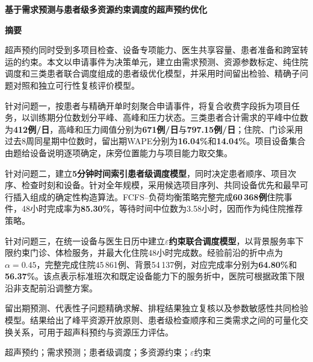 \documentclass[UTF8,a4paper,zihao=-4,fontset=windows]{ctexart}
\renewcommand{\thesubsection}{\arabic{section}.\arabic{subsection}}
\begin{document}
\songti{}\color{black}
\begin{center}
 \vspace*{0.10cm}
 {\heiti{}\bfseries 基于需求预测与患者级多资源约束调度的超声预约优化}\par
 \vspace{14pt}
 {\heiti{}\bfseries 摘\quad 要}
\end{center}

超声预约同时受到多项目检查、设备专项能力、医生共享容量、患者准备和跨室转运的约束。本文以申请事件为决策单元，建立由需求预测、资源参数标定、纯住院调度和三类患者联合调度组成的患者级优化模型，并采用时间留出检验、精确子问题对照和独立可行性复核评价模型。

针对问题一，按患者与精确开单时刻聚合申请事件，将复合收费字段拆为项目任务，以训练期分位数划分平峰、高峰和压力状态。三类患者合计需求的平峰中位数为{\heiti\bfseries 412例/日}，高峰和压力阈值分别为{\heiti\bfseries 671例/日}与{\heiti\bfseries 797.15例/日}；住院、门诊采用过去8周同星期中位数时，留出期WAPE分别为{\heiti\bfseries 16.04\%}和{\heiti\bfseries 14.04\%}。项目设备集合由题给设备说明逐项确定，床旁位置能力与项目能力取交集。

针对问题二，建立{\heiti\bfseries 5分钟时间索引患者级调度模型}，同时决定患者顺序、项目次序、检查时刻和设备。针对全年规模，采用候选项目序列、共同设备优先和最早可行插入组成的确定性构造算法。FCFS--负荷均衡策略完整完成{\heiti\bfseries 60\,368例}住院事件，48小时完成率为{\heiti\bfseries 85.30\%}，等待时间中位数为3.58小时，因而作为纯住院推荐策略。

针对问题三，在统一设备与医生日历中建立{\heiti\bfseries $\varepsilon$约束联合调度模型}，以背景服务率下限约束门诊、体检服务，并最大化住院48小时完成数。经验前沿的折中点为{\heiti\bfseries $\alpha=0.45$}，完整完成住院45\,861例、背景54\,137例，对应完成率分别为{\heiti\bfseries 64.80\%}和{\heiti\bfseries 56.37\%}。该点表示标准班次和既定设备能力下的服务折中，医院可根据政策下限沿非支配前沿调整方案。

留出期预测、代表性子问题精确求解、排程结果独立复核以及参数敏感性共同检验模型。结果给出了峰平资源开放原则、患者级检查顺序和三类需求之间的可量化交换关系，可用于超声科预约与资源压力评估。

\vspace{7pt}
超声预约；需求预测；患者级调度；多资源约束；$\varepsilon$约束

\clearpage










\label{body:lastpage}
\clearpage

\clearpage
\appendix
{}
\renewcommand{\thesubsection}{\Alph{section}.\arabic{subsection}}

\end{document}

